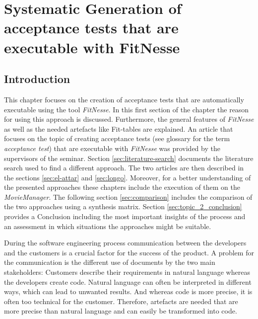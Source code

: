 

\chapter{Systematic Generation of acceptance tests that are executable with FitNesse}
\label{sec:topic_2}

\section{Introduction}\label{sec:topic_2_intro}

This chapter focuses on the creation of acceptance tests that are automatically executable using the tool \textit{FitNesse}.
In this first section of the chapter the reason for using this approach is discussed.
Furthermore, the general features of \textit{FitNesse} as well as the needed artefacts like Fit-tables are explained.
An article that focuses on the topic of creating acceptance tests (see glossary for the term \textit{acceptance test}) that are executable with \textit{FitNesse} was provided by the supervisors of the seminar.
Section \ref{sec:literature-search} documents the literature search used to find a different approach.
The two articles are then described in the sections \ref{sec:el-attar} and \ref{sec:longo}.
Moreover, for a better understanding of the presented approaches these chapters include the execution of them on the \textit{MovieManager}.
The following section \ref{sec:comparison} includes the comparison of the two approaches using a synthesis matrix.
Section \ref{sec:topic_2_conclusion} provides a Conclusion including the most important insights of the process and an assessment in which situations the approaches might be suitable.

During the software engineering process communication between the developers and the customers is a crucial factor for the success of the product.
A problem for the communication is the different use of documents by the two main stakeholders:
Customers describe their requirements in natural language whereas the developers create code.
Natural language can often be interpreted in different ways, which can lead to unwanted results.
And whereas code is more precise, it is often too technical for the customer.
Therefore, artefacts are needed that are more precise than natural language and can easily be transformed into code.

